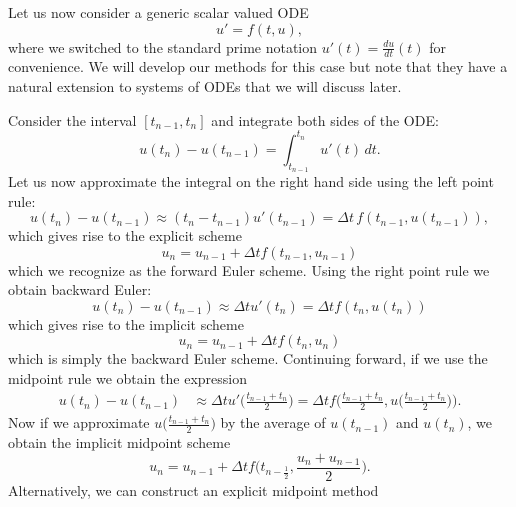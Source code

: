 Let us now consider a generic scalar valued ODE 
\begin{equation*}
    u' = f(t,u), 
\end{equation*}
where we switched to the standard prime notation 
$u'(t) = \frac{d u}{dt}(t)$ for convenience.
We will develop our methods for this case but note that 
they have a natural extension to systems of ODEs that 
we will discuss later. 

Consider the interval $[t_{n-1}, t_n]$ and integrate both sides of the ODE:
\begin{equation*}
    u(t_n) - u(t_{n-1}) = 
    \int_{t_{n-1}}^{t_n} u'(t) \, dt.
\end{equation*}
Let us now approximate the integral on the 
right hand side using the left point rule: 
\begin{equation*}
    u(t_n) - u(t_{n-1}) \approx (t_n - t_{n-1}) u'(t_{n-1}) 
    = \Delta t \, f(t_{n-1}, u(t_{n-1})),
\end{equation*}
which gives rise to the explicit scheme 
\begin{equation*}
    u_n = u_{n-1} + \Delta t f(t_{n-1}, u_{n-1})
\end{equation*}
which we recognize as the forward Euler scheme. Using the 
right point rule we obtain backward Euler:
\begin{equation*}
    u(t_n) - u(t_{n-1}) \approx \Delta t u'(t_n) 
    = \Delta t f(t_n, u(t_n)) 
\end{equation*}
which gives rise to the implicit scheme 
\begin{equation*}
    u_n = u_{n-1} + \Delta t f(t_n, u_n)
\end{equation*}
which is simply the backward Euler scheme. 
Continuing forward, if we use the midpoint rule we 
obtain the expression
\begin{equation*}
    \begin{aligned}
    u(t_n) - u(t_{n-1}) &\approx 
    \Delta t u'\Big(\frac{t_{n-1}+t_n}{2}\Big) 
    = \Delta t f\Big(\frac{t_{n-1}+t_n}{2}, u\Big(\frac{t_{n-1}+t_n}{2}\Big)\Big).
    \end{aligned}
\end{equation*}
Now if we approximate $u\Big(\frac{t_{n-1}+t_n}{2}\Big)$ 
by the average of $u(t_{n-1})$ and $u(t_n)$, 
we obtain the implicit midpoint scheme 
\begin{equation*}
    u_n = u_{n-1} + \Delta t f \Big( t_{n- \frac12}, \frac{u_n + u_{n-1}}{2} \Big).
\end{equation*}
Alternatively, we can construct an explicit midpoint method 
